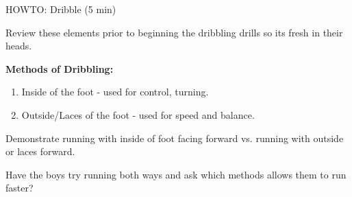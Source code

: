 \begin{evenBlock}{HOWTO:  Dribble (5 min)}

\begin{minipage}[t]{\linewidth}
    \centering
    Review these elements prior to beginning the dribbling drills so its fresh in their heads.

    
        \textbf{Methods of Dribbling:}
        \begin{enumerate}
        \setlength{\itemsep}{0pt}
        \setlength{\parskip}{0pt}
        \setlength{\parsep}{0pt}
        \item Inside of the foot - used for control, turning.
        \item Outside/Laces of the foot - used for speed and balance.
        \end{enumerate}
        
        Demonstrate running with inside of foot facing forward vs. running with outside or laces forward.

        Have the boys try running both ways and ask which methods allows them to run faster?

\end{minipage}

\end{evenBlock}